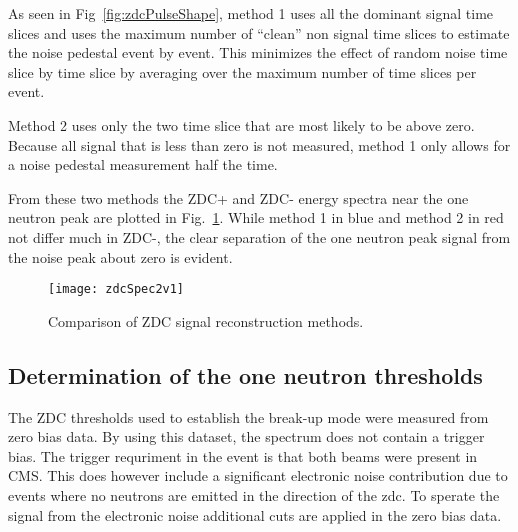       As seen in Fig~\ref{fig:zdcPulseShape}, method 1 uses all the dominant 
        signal time slices and uses the maximum number of “clean” non signal 
        time slices to estimate the noise pedestal event by event. 
      This minimizes the effect of random noise time slice by time slice by 
        averaging over the maximum number of time slices per event. 

      Method 2 uses only the two time slice that are most likely to be above 
        zero. 
      Because all signal that is less than zero is not measured, method 1 
        only allows for a noise pedestal measurement half the time.
    
      From these two methods the ZDC+ and ZDC- energy spectra near the 
        one neutron peak are plotted in Fig.~\ref{fig:zdcSpec2v1}.
      While method 1 in blue and method 2 in red not differ much in ZDC-, 
        the clear separation of the one neutron peak signal from the noise 
        peak about zero is evident. 
      \begin{figure}[h]
        \centering
        \texttt{[image: zdcSpec2v1]}
        \caption{Comparison of ZDC signal reconstruction methods.}
        \label{fig:zdcSpec2v1}
      \end{figure}

    \subsection{Determination of the one neutron thresholds}
      The ZDC thresholds used to establish the break-up mode were measured from
        zero bias data.
      By using this dataset, the spectrum does not contain a trigger bias. 
      The trigger requriment in the event is that both beams were present in 
        CMS.
      This does however include a significant electronic noise contribution due
        to events where no neutrons are emitted in the direction of the zdc.
      To sperate the signal from the electronic noise additional cuts are 
        applied in the zero bias data.

